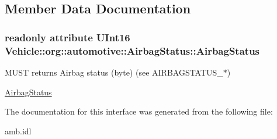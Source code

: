 \subsection{Member Data Documentation}
\hypertarget{interfaceVehicle_1_1org_1_1automotive_1_1AirbagStatus_a5007ee19b6e0a4837f4158fc70774b17}{
\subsubsection[{Airbag\-Status}]{\setlength{\rightskip}{0pt plus 5cm}readonly attribute U\-Int16 Vehicle\-::org\-::automotive\-::\-Airbag\-Status\-::\-Airbag\-Status}}\label{interfaceVehicle_1_1org_1_1automotive_1_1AirbagStatus_a5007ee19b6e0a4837f4158fc70774b17}


M\-U\-S\-T returns Airbag status (byte) (see A\-I\-R\-B\-A\-G\-S\-T\-A\-T\-U\-S\-\_\-$\ast$) 

\hyperlink{interfaceVehicle_1_1org_1_1automotive_1_1AirbagStatus}{Airbag\-Status} 

The documentation for this interface was generated from the following file\-:\begin{DoxyCompactItemize}
\item 
amb.\-idl\end{DoxyCompactItemize}
